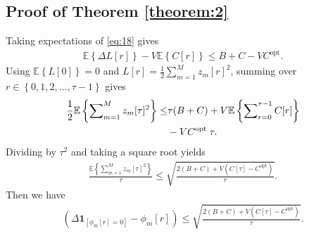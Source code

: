 \documentclass[journal]{IEEEtran}
\begin{document}
\begin{appendices}
\section{Proof of Theorem \ref{theorem:2}}
Taking expectations of \eqref{eq:18} gives
\begin{align}
    \mathbb{E}\left\{ \Delta L[r]\right\}-V\mathbb{E}\left\{ C[r]\right\} \le B+C-VC^{\text{opt}}.
\end{align}
Using $\mathbb{E}\left\{ L[0]\right\}=0$ and $L[r]=\frac{1}{2}\sum_{m=1}^{M}z_m[r]^2$, summing over $r \in \left\{ 0,1,2,\dots,\tau-1\right\}$ gives
\begin{align}
    \frac{1}{2} \mathbb{E}\left\{\sum\nolimits_{m=1}^{M} z_{m}[\tau]^{2}\right\} \leq& \tau(B+C)+V \mathbb{E}\left\{\sum\nolimits_{r=0}^{\tau-1} C[r]\right\} \notag \\
    &-V C^{\text {opt }} \tau.
\end{align}
Dividing by $\tau^2$ and taking a square root yields
\begin{align}
    \frac{\mathbb{E}\left\{\sum_{m=1}^{M} z_{m}[\tau]^{2}\right\}}{\tau} \leq \sqrt{\frac{2(B+C)+V\left(C[\tau]-C^{\mathrm{opt}}\right)}{\tau}}.
\end{align}
Then we have
\begin{align}
    (\Delta {\boldsymbol 1}_{[\phi_m[r]=0]}-\phi_m[r])\leq \sqrt{\frac{2(B+C)+V\left(C[\tau]-C^{\mathrm{opt}}\right)}{\tau}}.
\end{align}
\end{appendices}



\end{document}
